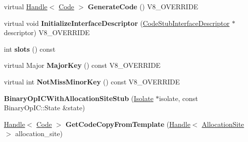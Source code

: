 \begin{DoxyCompactItemize}
\item 
\hypertarget{classv8_1_1internal_1_1_v8___f_i_n_a_l_a0ed5719f94df27f3b0c610b0a4934a70}{}virtual \hyperlink{classv8_1_1internal_1_1_handle}{Handle}$<$ \hyperlink{classv8_1_1internal_1_1_code}{Code} $>$ {\bfseries Generate\+Code} () V8\+\_\+\+O\+V\+E\+R\+R\+I\+D\+E\label{classv8_1_1internal_1_1_v8___f_i_n_a_l_a0ed5719f94df27f3b0c610b0a4934a70}

\item 
\hypertarget{classv8_1_1internal_1_1_v8___f_i_n_a_l_aedb89fb967acc9802a2789257d456f13}{}virtual void {\bfseries Initialize\+Interface\+Descriptor} (\hyperlink{classv8_1_1internal_1_1_code_stub_interface_descriptor}{Code\+Stub\+Interface\+Descriptor} $\ast$descriptor) V8\+\_\+\+O\+V\+E\+R\+R\+I\+D\+E\label{classv8_1_1internal_1_1_v8___f_i_n_a_l_aedb89fb967acc9802a2789257d456f13}

\item 
\hypertarget{classv8_1_1internal_1_1_v8___f_i_n_a_l_a94b1d188565300d267497da091437e25}{}int {\bfseries slots} () const \label{classv8_1_1internal_1_1_v8___f_i_n_a_l_a94b1d188565300d267497da091437e25}

\item 
\hypertarget{classv8_1_1internal_1_1_v8___f_i_n_a_l_ae50db15936b838b4fcfbc1995bf37ad5}{}virtual Major {\bfseries Major\+Key} () const V8\+\_\+\+O\+V\+E\+R\+R\+I\+D\+E\label{classv8_1_1internal_1_1_v8___f_i_n_a_l_ae50db15936b838b4fcfbc1995bf37ad5}

\item 
\hypertarget{classv8_1_1internal_1_1_v8___f_i_n_a_l_abc0e5446ba661fc95fde9fa79f11918e}{}virtual int {\bfseries Not\+Miss\+Minor\+Key} () const V8\+\_\+\+O\+V\+E\+R\+R\+I\+D\+E\label{classv8_1_1internal_1_1_v8___f_i_n_a_l_abc0e5446ba661fc95fde9fa79f11918e}

\item 
\hypertarget{classv8_1_1internal_1_1_v8___f_i_n_a_l_a19e6f3dfda7559a96e9bf4aeb6ef6e35}{}{\bfseries Binary\+Op\+I\+C\+With\+Allocation\+Site\+Stub} (\hyperlink{classv8_1_1internal_1_1_isolate}{Isolate} $\ast$isolate, const Binary\+Op\+I\+C\+::\+State \&state)\label{classv8_1_1internal_1_1_v8___f_i_n_a_l_a19e6f3dfda7559a96e9bf4aeb6ef6e35}

\item 
\hypertarget{classv8_1_1internal_1_1_v8___f_i_n_a_l_a9b1e9e450d21c867fcf1f712a81b045b}{}\hyperlink{classv8_1_1internal_1_1_handle}{Handle}$<$ \hyperlink{classv8_1_1internal_1_1_code}{Code} $>$ {\bfseries Get\+Code\+Copy\+From\+Template} (\hyperlink{classv8_1_1internal_1_1_handle}{Handle}$<$ \hyperlink{classv8_1_1internal_1_1_allocation_site}{Allocation\+Site} $>$ allocation\+\_\+site)\label{classv8_1_1internal_1_1_v8___f_i_n_a_l_a9b1e9e450d21c867fcf1f712a81b045b}


\end{DoxyCompactItemize}
